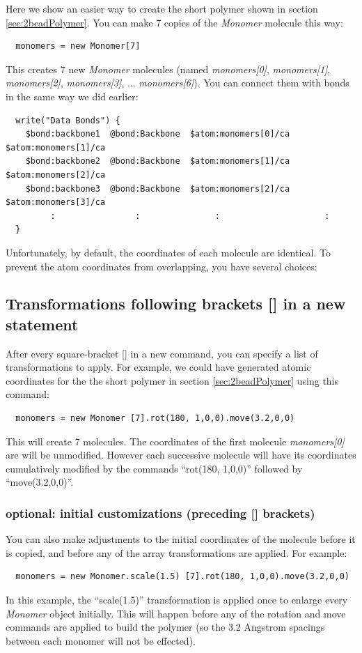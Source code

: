 \documentclass[11pt]{article}
\begin{document}
Here we show an easier way to create the short polymer 
shown in section \ref{sec:2beadPolymer}.
You can make 7 copies of the \textit{Monomer} molecule this way:
\begin{verbatim}
  monomers = new Monomer[7]
\end{verbatim}
This creates 7 new \textit{Monomer} molecules (named 
\mbox{\textit{monomers[0]}}, 
\mbox{\textit{monomers[1]}}, 
\mbox{\textit{monomers[2]}}, 
\mbox{\textit{monomers[3]}}, ... 
\mbox{\textit{monomers[6]}}).
You can connect them with bonds in the same way we did earlier:
\begin{verbatim}
  write("Data Bonds") {
    $bond:backbone1  @bond:Backbone  $atom:monomers[0]/ca  $atom:monomers[1]/ca
    $bond:backbone2  @bond:Backbone  $atom:monomers[1]/ca  $atom:monomers[2]/ca
    $bond:backbone3  @bond:Backbone  $atom:monomers[2]/ca  $atom:monomers[3]/ca
         :                :               :                     :
  }
\end{verbatim}

Unfortunately, by default, the coordinates of each molecule are identical.
To prevent the atom coordinates from overlapping, you have several choices:

\subsection{Transformations following brackets [] in a new statement}
\label{sec:arrays+xform}
   After every square-bracket [] in a new command,
you can specify a list of transformations to apply.
For example, we could have generated atomic coordinates for the 
the short polymer in section \ref{sec:2beadPolymer}
using this command:
\begin{verbatim}
  monomers = new Monomer [7].rot(180, 1,0,0).move(3.2,0,0)
\end{verbatim}
This will create 7 molecules.  
The coordinates of the first molecule \textit{monomers[0]} are will be unmodified.
However each successive molecule will have its coordinates cumulatively
modified by the commands ``rot(180, 1,0,0)'' followed by ``move(3.2,0,0)''.
\subsubsection*{optional: initial customizations (preceding [] brackets)}
\label{sec:xform+arrays+xform} 
You can also make adjustments to the initial coordinates of the molecule
before it is copied, and before any of the array transformations are applied.
For example:
\begin{verbatim}
  monomers = new Monomer.scale(1.5) [7].rot(180, 1,0,0).move(3.2,0,0)
\end{verbatim}
In this example, the ``scale(1.5)'' transformation is applied once to 
enlarge every \textit{Monomer} object initially.
This will happen before any of the rotation and move commands 
are applied to build the polymer
(so the 3.2 Angstrom spacings between each monomer will not be effected).
\end{document}
